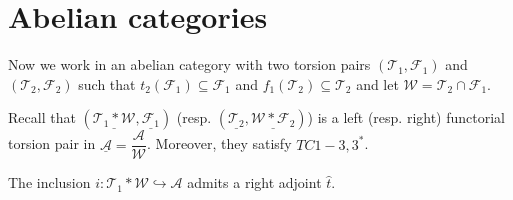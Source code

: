 \clearpage

\section{Abelian categories}

Now we work in an abelian category with two torsion pairs $(\mathcal{T}_1,\mathcal{F}_1)$
and $(\mathcal{T}_2,\mathcal{F}_2)$ such that $t_2(\mathcal{F}_1)\subseteq \mathcal{F}_1$ and
$f_1(\mathcal{T}_2)\subseteq \mathcal{T}_2$ and let $\mathcal{W}=\mathcal{T}_2\cap\mathcal{F}_1$.

Recall that $(\underline{\mathcal{T}_1\ast\mathcal{W}},\underline{\mathcal{F}_1})$
(resp. $(\underline{\mathcal{T}_2},\underline{\mathcal{W}\ast\mathcal{F}_2})$) is a left (resp. right)
functorial torsion pair in $\underline{\mathcal{A}} = \dfrac{\mathcal{A}}{\mathcal{W}}$. Moreover, they
satisfy $TC1-3,3^*$.

\begin{lemma}
  The inclusion $i:\mathcal{T}_1\ast \mathcal{W}\hookrightarrow \mathcal{A}$ admits a right adjoint
  $\widehat{t}$.
\end{lemma}


